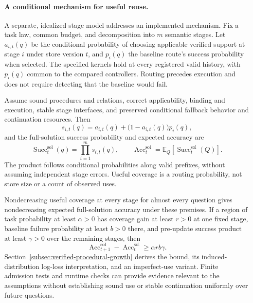 \documentclass[10pt]{article} %
\providecommand{\1}{\mathbf{1}}  %
\theoremstyle{remark}
\theoremstyle{definition}
\begin{document}
\paragraph{A conditional mechanism for useful reuse.}

A separate, idealized stage model addresses an implemented mechanism.
Fix a task law, common budget, and decomposition into $m$ semantic stages.
Let $a_{i,t}(q)$ be the conditional probability of choosing applicable
verified support at stage $i$ under store version $t$, and $p_i(q)$ the
baseline route's success probability when selected. The specified
kernels hold at every registered valid history, with $p_i(q)$ common to
the compared controllers. Routing precedes execution and does not require
detecting that the baseline would fail.

Assume sound procedures and relations, correct applicability, binding and
execution, stable stage interfaces, and preserved conditional fallback
behavior and continuation resources. Then
\begin{equation}
s_{i,t}(q)=a_{i,t}(q)+\bigl(1-a_{i,t}(q)\bigr)p_i(q),
\label{eq:intro-stage-reliability}
\end{equation}
and the full-solution success probability and expected accuracy are
\begin{equation}
\operatorname{Succ}^{\mathrm{sol}}_t(q)
=\prod_{i=1}^{m}s_{i,t}(q),
\qquad
\operatorname{Acc}^{\mathrm{sol}}_t
=\mathbb E_Q\!\left[\operatorname{Succ}^{\mathrm{sol}}_t(Q)\right].
\label{eq:intro-solution-accuracy}
\end{equation}
The product follows conditional probabilities along valid prefixes,
without assuming independent stage errors. Useful coverage is a routing
probability, not store size or a count of observed uses.

Nondecreasing useful coverage at every stage for almost every question
gives nondecreasing expected full-solution accuracy under these premises.
If a region of task probability at least $\alpha>0$ has coverage gain at
least $r>0$ at one fixed stage, baseline failure probability at least
$b>0$ there, and pre-update success product at least $\gamma>0$ over the
remaining stages, then
\begin{equation}
\operatorname{Acc}^{\mathrm{sol}}_{t+1}
-\operatorname{Acc}^{\mathrm{sol}}_t
\geq\alpha rb\gamma.
\label{eq:intro-verified-reuse-gain}
\end{equation}
Section~\ref{subsec:verified-procedural-growth} derives the bound, its
induced-distribution log-loss interpretation, and an imperfect-use variant.
Finite admission tests and runtime checks can provide evidence relevant
to the assumptions without establishing sound use or stable continuation
uniformly over future questions.
\end{document}
